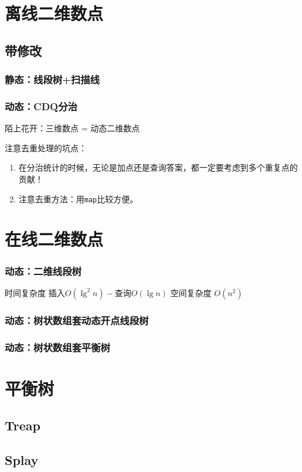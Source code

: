 \documentclass{article}
\begin{document}
	\section{离线二维数点}
		\subsection{带修改}
			\subsubsection{静态：线段树+扫描线}
			\subsubsection{动态：CDQ分治}
			陌上花开：三维数点 = 动态二维数点
			
			注意去重处理的坑点：
			\begin{enumerate}
				\item 在分治统计的时候，无论是加点还是查询答案，都一定要考虑到多个重复点的贡献！
				\item 注意去重方法：用\lstinline|map|比较方便。
			\end{enumerate}
			
	\section{在线二维数点}
		\subsubsection{动态：二维线段树}
		时间复杂度 $\text{插入} O(\lg^2 n) - \text{查询} O(\lg n)$
		空间复杂度 $O(n^2)$
		\subsubsection{动态：树状数组套动态开点线段树}
		\subsubsection{动态：树状数组套平衡树}
	\newpage

	\section{平衡树}
		\subsection{Treap}
		
		\subsection{Splay}
		
\end{document}
